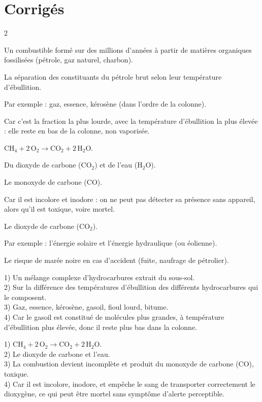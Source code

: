 \section{Corrigés}
\begin{multicols}{2}

Un combustible formé sur des millions d'années à partir de matières organiques
fossilisées (pétrole, gaz naturel, charbon).

La séparation des constituants du pétrole brut selon leur température d'ébullition.

Par exemple : gaz, essence, kérosène (dans l'ordre de la colonne).

Car c'est la fraction la plus lourde, avec la température d'ébullition la plus élevée :
elle reste en bas de la colonne, non vaporisée.

$\mathrm{CH_4+2\,O_2\longrightarrow CO_2+2\,H_2O}$.

Du dioxyde de carbone ($\mathrm{CO_2}$) et de l'eau ($\mathrm{H_2O}$).

Le monoxyde de carbone (CO).

Car il est incolore et inodore : on ne peut pas détecter sa présence sans appareil, alors
qu'il est toxique, voire mortel.

Le dioxyde de carbone ($\mathrm{CO_2}$).

Par exemple : l'énergie solaire et l'énergie hydraulique (ou éolienne).

Le risque de marée noire en cas d'accident (fuite, naufrage de pétrolier).

1) Un mélange complexe d'hydrocarbures extrait du sous-sol.\\
2) Sur la différence des températures d'ébullition des différents hydrocarbures qui le
composent.\\
3) Gaz, essence, kérosène, gasoil, fioul lourd, bitume.\\
4) Car le gasoil est constitué de molécules plus grandes, à température d'ébullition plus
élevée, donc il reste plus bas dans la colonne.

1) $\mathrm{CH_4+2\,O_2\longrightarrow CO_2+2\,H_2O}$.\\
2) Le dioxyde de carbone et l'eau.\\
3) La combustion devient incomplète et produit du monoxyde de carbone (CO), toxique.\\
4) Car il est incolore, inodore, et empêche le sang de transporter correctement le
dioxygène, ce qui peut être mortel sans symptôme d'alerte perceptible.


\end{multicols}
